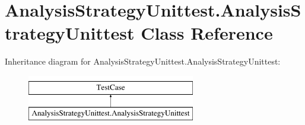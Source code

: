 \hypertarget{classAnalysisStrategyUnittest_1_1AnalysisStrategyUnittest}{\section{Analysis\-Strategy\-Unittest.\-Analysis\-Strategy\-Unittest Class Reference}
\label{classAnalysisStrategyUnittest_1_1AnalysisStrategyUnittest}
}
Inheritance diagram for Analysis\-Strategy\-Unittest.\-Analysis\-Strategy\-Unittest\-:\begin{figure}[H]
\begin{center}
\leavevmode
\includegraphics[height=2.000000cm]{classAnalysisStrategyUnittest_1_1AnalysisStrategyUnittest}
\end{center}
\end{figure}
